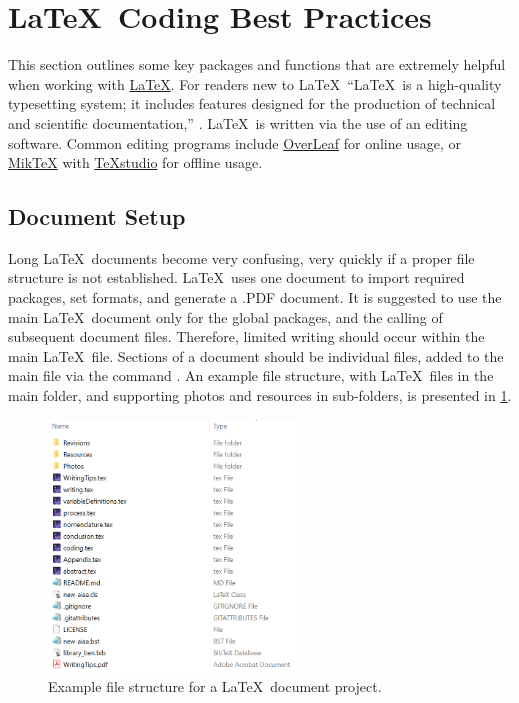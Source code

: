 \section{\LaTeX~Coding Best Practices} \label{sec:Conclusion}
This section outlines some key packages and functions that are extremely helpful when working with \href{https://www.latex-project.org/}{\LaTeX}. 
For readers new to \LaTeX\, ``LaTeX\ is a high-quality typesetting system; it includes features designed for the production of technical and scientific documentation,'' \cite{latexExplanation}. 
\LaTeX\ is written via the use of an editing software. 
Common editing programs include \href{https://www.overleaf.com/}{OverLeaf} for online usage, or \href{https://miktex.org/}{Mik\TeX} with \href{https://www.texstudio.org/}{\TeX studio} for offline usage. 

\subsection{Document Setup}
Long \LaTeX\ documents become very confusing, very quickly if a proper file structure is not established. 
\LaTeX\ uses one document to import required packages, set formats, and generate a .PDF document. 
It is suggested to use the main \LaTeX\ document only for the global packages, and the calling of subsequent document files. 
Therefore, limited writing should occur within the main \LaTeX\ file. 
Sections of a document should be individual files, added to the main file via the command \verb*||. 
An example file structure, with \LaTeX\ files in the main folder, and supporting photos and resources in sub-folders, is presented in \cref{fig:documentSetupExample}.


\begin{figure}[hbt!]
	\centering
	\captionsetup{width=0.6\textwidth}
	\includegraphics[width=0.6\textwidth]{Photos/Figures/projectStructure.png}
	\caption{Example file structure for a \LaTeX\ document project.}
	\label{fig:documentSetupExample}
	\hfill
\end{figure}


